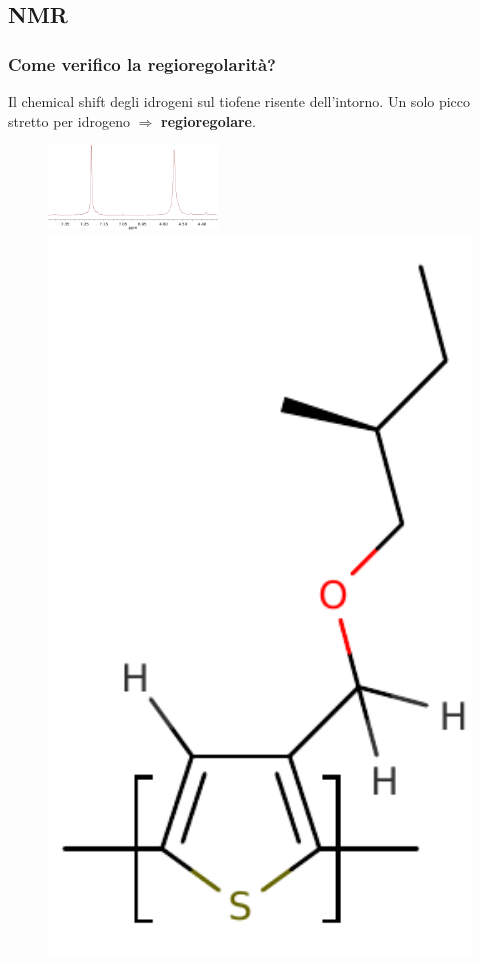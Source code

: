 \documentclass{beamer}
\begin{document}
\subsection{NMR}
\begin{frame}%
\frametitle{Come verifico la regioregolarità?}
Il chemical shift degli idrogeni sul tiofene risente dell'intorno.
\vfill
Un solo picco stretto per idrogeno $\Rightarrow$ \textbf{regioregolare}.
\vfill
\begin{figure}\centering \includegraphics[trim=0 0 348 0cm,clip,width=0.4\textwidth]{img/ig2-15-nmr-h.pdf}
\begin{minipage}{0.15\textwidth}\vspace{-100pt}
\includegraphics[width=1\textwidth]{img/polimero-idrogeni.pdf}

\end{minipage}
\end{figure}
\end{frame}
\end{document}
